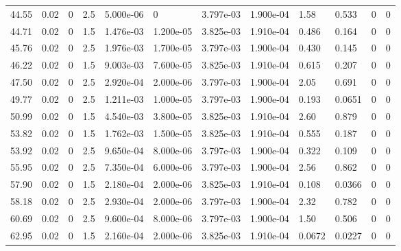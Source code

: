 \documentclass[preview]{standalone}
\begin{document}
{{\begin{tabular}{L{1.2cm}C{1.2cm} C{0.3cm}C{0.5cm} C{1.4cm}C{1.4cm} C{1.4cm}C{1.4cm} C{1.6cm}C{1.6cm} C{1.6cm}C{1.6cm}}
  44.55  &  0.02  & 0     & 2.5 &  5.000e-06  & 0  &  3.797e-03&   1.900e-04& 1.58 & 0.533   &  0 & 0  \\ 
  44.71  &  0.02  & 0     & 1.5 &  1.476e-03  & 1.200e-05  &  3.825e-03&   1.910e-04& 0.486 & 0.164   &  0 & 0  \\ 
  45.76  &  0.02  & 0     & 2.5 &  1.976e-03  & 1.700e-05  &  3.797e-03&   1.900e-04& 0.430 & 0.145   &  0 & 0  \\ 
  46.22  &  0.02  & 0     & 1.5 &  9.003e-03  & 7.600e-05  &  3.825e-03&   1.910e-04& 0.615 & 0.207   &  0 & 0  \\ 
  47.50  &  0.02  & 0     & 2.5 &  2.920e-04  & 2.000e-06  &  3.797e-03&   1.900e-04& 2.05 & 0.691   &  0 & 0  \\ 
  49.77  &  0.02  & 0     & 2.5 &  1.211e-03  & 1.000e-05  &  3.797e-03&   1.900e-04& 0.193 & 0.0651   &  0 & 0  \\ 
  50.99  &  0.02  & 0     & 1.5 &  4.540e-03  & 3.800e-05  &  3.825e-03&   1.910e-04& 2.60 & 0.879   &  0 & 0  \\ 
  53.82  &  0.02  & 0     & 1.5 &  1.762e-03  & 1.500e-05  &  3.825e-03&   1.910e-04& 0.555 & 0.187   &  0 & 0  \\ 
  53.92  &  0.02  & 0     & 2.5 &  9.650e-04  & 8.000e-06  &  3.797e-03&   1.900e-04& 0.322 & 0.109   &  0 & 0  \\ 
  55.95  &  0.02  & 0     & 2.5 &  7.350e-04  & 6.000e-06  &  3.797e-03&   1.900e-04& 2.56 & 0.862   &  0 & 0  \\ 
  57.90  &  0.02  & 0     & 1.5 &  2.180e-04  & 2.000e-06  &  3.825e-03&   1.910e-04& 0.108 & 0.0366   &  0 & 0  \\ 
  58.18  &  0.02  & 0     & 2.5 &  2.930e-04  & 2.000e-06  &  3.797e-03&   1.900e-04& 2.32 & 0.782   &  0 & 0  \\ 
  60.69  &  0.02  & 0     & 2.5 &  9.600e-04  & 8.000e-06  &  3.797e-03&   1.900e-04& 1.50 & 0.506   &  0 & 0  \\ 
  62.95  &  0.02  & 0     & 1.5 &  2.160e-04  & 2.000e-06  &  3.825e-03&   1.910e-04& 0.0672 & 0.0227   &  0 & 0  \\ 
\hline 
\end{tabular} 

}}
\end{document}
